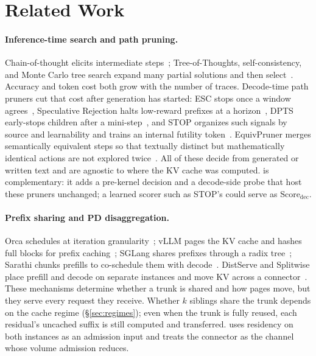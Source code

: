 \section{Related Work}
\label{sec:related}

\paragraph{Inference-time search and path pruning.}
Chain-of-thought elicits intermediate steps~\cite{cot}; Tree-of-Thoughts, self-consistency, and Monte Carlo tree search expand many partial solutions and then select~\cite{tot,selfconsistency,mctsllm}.
Accuracy and token cost both grow with the number of traces.
Decode-time path pruners cut that cost after generation has started: ESC stops once a window agrees~\cite{esc}, Speculative Rejection halts low-reward prefixes at a horizon~\cite{specrej}, DPTS early-stops children after a mini-step~\cite{dpts}, and STOP organizes such signals by source and learnability and trains an internal futility token~\cite{stoploss}.
EquivPruner merges semantically equivalent steps so that textually distinct but mathematically identical actions are not explored twice~\cite{equivpruner}.
All of these decide from generated or written text and are agnostic to where the KV cache was computed.
\sys is complementary: it adds a pre-kernel decision and a decode-side probe that host these pruners unchanged; a learned scorer such as STOP's could serve as $\mathrm{Score}_{\mathrm{dec}}$.

\paragraph{Prefix sharing and PD disaggregation.}
Orca schedules at iteration granularity~\cite{orca}; vLLM pages the KV cache and hashes full blocks for prefix caching~\cite{vllm}; SGLang shares prefixes through a radix tree~\cite{sglang}; Sarathi chunks prefills to co-schedule them with decode~\cite{sarathi,sarathisplit}.
DistServe and Splitwise place prefill and decode on separate instances and move KV across a connector~\cite{distserve,splitwise}.
These mechanisms determine whether a trunk is shared and how pages move, but they serve every request they receive.
Whether $k$ siblings share the trunk depends on the cache regime (\S\ref{sec:regimes}); even when the trunk is fully reused, each residual's uncached suffix is still computed and transferred.
\sys uses residency on both instances as an admission input and treats the connector as the channel whose volume admission reduces.

